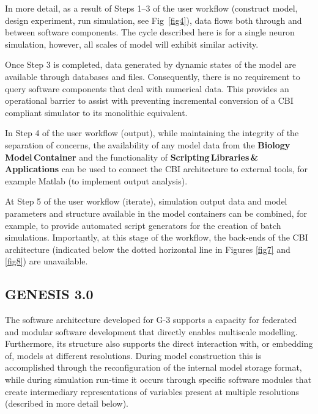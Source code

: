 \documentclass[10pt,letterpaper]{article}
\begin{document}
In more detail, as a result of Steps 1--3 of the user workflow (construct model, design experiment, run simulation, see Fig~\ref{fig4}), data flows both through and between software components. The cycle described here is for a single neuron simulation, however, all scales of model will exhibit similar activity.

Once Step 3 is completed, data generated by dynamic states of the model are available through databases and files. Consequently, there is no requirement to query software components that deal with numerical data. This provides an operational barrier to assist with preventing incremental conversion of a CBI compliant simulator to its monolithic equivalent.

In Step 4 of the user workflow (output), while maintaining the integrity of the separation of concerns, the availability of any model data from the {\bf Biology\,Model\,Container} and the functionality of {\bf Scripting\,Libraries\,\&\,Applications} can be used to connect the CBI architecture to external tools, for example Matlab (to implement output analysis).

At Step 5 of the user workflow (iterate), simulation output data and model parameters and structure available in the model containers can be combined, for example, to provide automated script generators for the creation of batch simulations. Importantly, at this stage of the workflow, the back-ends of the CBI architecture (indicated below the dotted horizontal line in Figures \ref{fig7} and \ref{fig8}) are unavailable. 

\subsection*{GENESIS 3.0}

The software architecture developed for G-3 supports a capacity for federated and modular software development that directly enables multiscale modelling.  Furthermore, its structure also supports the direct interaction with, or embedding of, models at different resolutions.  During model construction this is accomplished through the reconfiguration of the internal model storage format, while during simulation run-time it occurs through specific software modules that create intermediary representations of variables present at multiple resolutions (described in more detail below).
\end{document}
